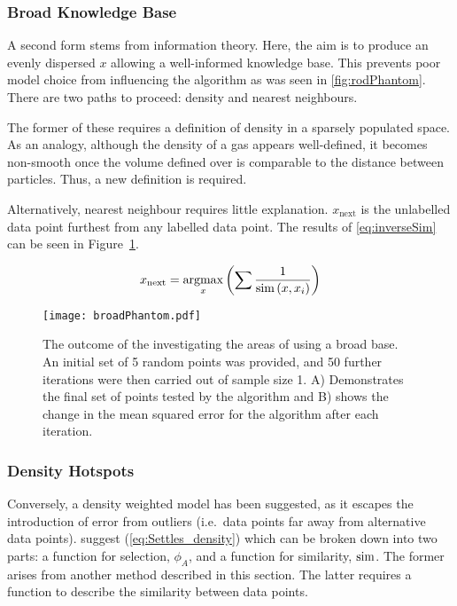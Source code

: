 \subsubsection{Broad Knowledge Base}
A second form stems from information theory. Here, the aim is to produce an evenly dispersed $x$ allowing a well-informed knowledge base. This prevents poor model choice from influencing the algorithm as was seen in \ref{fig:rodPhantom}. There are two paths to proceed: density and nearest neighbours.

The former of these requires a definition of density in a sparsely populated space. As an analogy, although the density of a gas appears well-defined, it becomes non-smooth once the volume defined over is comparable to the distance between particles. Thus, a new definition is required.

Alternatively, nearest neighbour requires little explanation. $x_\mathrm{next}$ is the unlabelled data point furthest from any labelled data point. The results of \ref{eq:inverseSim} can be seen in Figure~\ref{fig:b}.

\begin{equation}
  \label{eq:inverseSim}
  x_\mathrm{next}=\operatorname*{argmax}_x{\left(\sum{\frac{1}{\operatorname*{sim}{(x, x_i)}}}\right)}
\end{equation}

\begin{figure}[H]
  \begin{center}
    \texttt{[image: broadPhantom.pdf]}
    \caption[Broad-Base Sampling Illustration]{The outcome of the investigating the areas of using a broad base. An initial set of 5 random points was provided, and 50 further iterations were then carried out of sample size 1. A) Demonstrates the final set of points tested by the algorithm and B) shows the change in the mean squared error for the algorithm after each iteration.}
    \label{fig:b}
  \end{center}
\end{figure}


\subsubsection{Density Hotspots}
\label{sec:litRevDH}
Conversely, a density weighted model has been suggested, as it escapes the introduction of error from outliers (i.e.\ data points far away from alternative data points). \textcite{Set08} suggest (\ref{eq:Settles_density}) which can be broken down into two parts: a function for selection, $\phi_A$, and a function for similarity, $\operatorname*{sim}$. The former arises from  another method described in this section. The latter requires a function to describe the similarity between data points.


